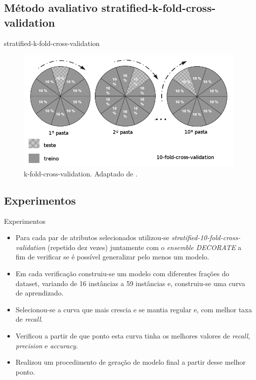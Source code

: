 \documentclass[brazil]{beamer}
\begin{document}
\subsection{Método avaliativo stratified-k-fold-cross-validation}
\begin{frame}{stratified-k-fold-cross-validation}
\begin{figure}[!htb] \centering 
  \centering
  \includegraphics[width=0.8\columnwidth]{slide/k-fold-crossvalidation} 
  \caption{k-fold-cross-validation. Adaptado de \cite{Olson:2008}.} 
  \label{fig:k-fold-crossvalidation}
\end{figure}
\end{frame}

\subsection{Experimentos}
\begin{frame}{Experimentos}
   \begin{itemize}
\justifying
      \item <1 ->Para cada par de atributos selecionados utilizou-se \textit{stratified-10-fold-cross-validation} (repetido dez vezes) juntamente com o \textit{ensemble DECORATE} a fim de verificar se é possível generalizar pelo menos um modelo.
      \item <2 ->Em cada verificação construiu-se um modelo com diferentes frações do dataset, variando de 16 instâncias a 59 instâncias e, construiu-se uma curva de aprendizado.
      \item <3 ->Selecionou-se a curva que mais crescia e se mantia regular e, com melhor taxa de \textit{recall}.
      \item <4 ->Verificou a partir de que ponto esta curva tinha os melhores valores de \textit{recall}, \textit{precision} e \textit{accuracy}.
      \item <5 ->Realizou um procedimento de geração de modelo final a partir desse melhor ponto.
   \end{itemize}
\end{frame}
\end{document}
